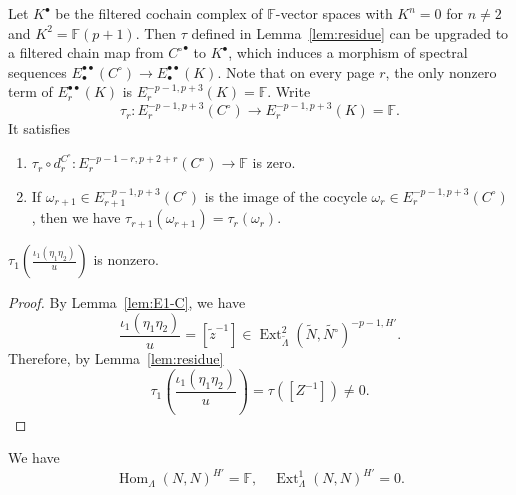 \documentclass[11pt,a4paper]{article} %
\def\FF{\mathbb{F}}
\def\Ext{\operatorname{Ext}} %
\def\Hom{\operatorname{Hom}}
\begin{document}
Let $K^\bullet$ be the filtered cochain complex of $\FF$-vector spaces with $K^n=0$ for $n\ne2$ and $K^2=\FF(p+1)$. Then $\tau$ defined in Lemma~\ref{lem:residue} can be upgraded to a filtered chain map from ${C^\circ}^\bullet$ to $K^\bullet$, which induces a morphism of spectral sequences $E_\bullet^{\bullet\bullet}(C^\circ)\to E_\bullet^{\bullet\bullet}(K)$. Note that on every page $r$, the only nonzero term of $E_r^{\bullet\bullet}(K)$ is $E_r^{-p-1,p+3}(K)=\FF$. Write 
\[
\tau_r:E_r^{-p-1,p+3}(C^\circ)\longrightarrow E_r^{-p-1,p+3}(K)=\FF.
\]
It satisfies
\begin{enumerate}
    \item $\tau_r\circ d_r^{C^\circ}:E_r^{-p-1-r,p+2+r}(C^\circ)\to\FF$ is zero.
    \item If $\omega_{r+1}\in E_{r+1}^{-p-1,p+3}(C^\circ)$ is the image of the cocycle $\omega_r\in E_r^{-p-1,p+3}(C^\circ)$, then we have $\tau_{r+1}(\omega_{r+1})=\tau_r(\omega_r)$.
\end{enumerate}

\begin{lemma}\label{lem:residue-nonzero}
    $\tau_1(\frac{\iota_1(\eta_1\eta_2)}{u})$ is nonzero.
\end{lemma}

\begin{proof}
    By Lemma~\ref{lem:E1-C}, we have 
    \[
    \frac{\iota_1(\eta_1\eta_2)}{u}=[\widetilde{z}^{-1}]\in\Ext_{\widetilde{\Lambda}}^2(\widetilde{N},\widetilde{N^\circ})^{-p-1,H'}.
    \]
    Therefore, by Lemma~\ref{lem:residue}
    \[
    \tau_1(\frac{\iota_1(\eta_1\eta_2)}{u})=\tau([Z^{-1}])\ne0.
    \]
\end{proof}

\begin{proposition}\label{prop:ext-N}
    We have 
    \[
    \Hom_\Lambda(N,N)^{H'}=\FF,\quad\Ext^1_{\Lambda}(N,N)^{H'}=0.
    \]
\end{proposition}
\end{document}
